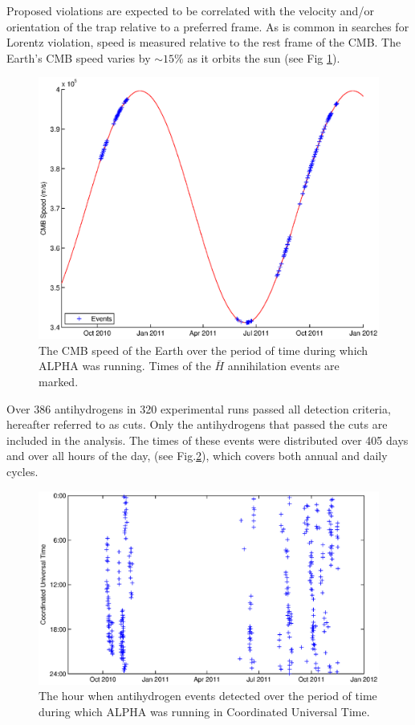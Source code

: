 \documentclass[superscriptaddress,aps,prb,11pt]{revtex4-1}
\begin{document}
Proposed violations are expected to be correlated with the velocity and/or orientation of the trap relative to a preferred frame.  As is common in searches for Lorentz violation, speed is measured relative to the rest frame of the CMB.  The Earth's CMB speed varies by $\sim\!\!15\%$ as it orbits the sun (see Fig \ref{fig:true_event_distribution}).

\begin{figure}
  \includegraphics[scale=0.5]{True_Event_Distribution.eps}
  \caption{The CMB speed of the Earth over the period of time during which ALPHA was running.  Times of the $\bar{H}$ annihilation events are marked.}
  \label{fig:true_event_distribution}
\end{figure}

Over 386 antihydrogens in 320 experimental runs passed all detection criteria, hereafter referred to as cuts\cite{fractionalcharge}.  Only the antihydrogens that passed the cuts are included in the analysis.  The times of these events were distributed over 405 days and over all hours of the day, (see Fig.\ref{fig:eventTime_date_experiment}), which covers both annual and daily cycles.

\begin{figure}
  \includegraphics[scale=0.6]{eventTime_date_experiment.eps}
  \caption{The hour when antihydrogen events detected over the period of time during which ALPHA was running in Coordinated Universal Time.}
  \label{fig:eventTime_date_experiment}
\end{figure}
\end{document}

